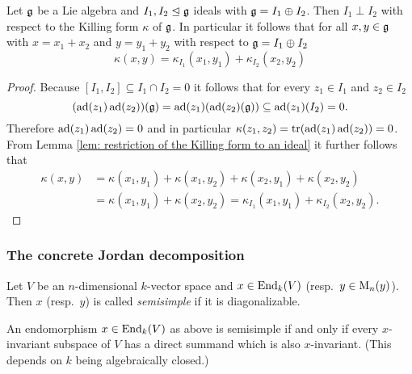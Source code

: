\begin{lem}
 Let $\mathfrak{g}$ be a Lie algebra and $I_1, I_2 \trianglelefteq \mathfrak{g}$ ideals with $\mathfrak{g} = I_1 \oplus I_2$. Then $I_1 \perp I_2$ with respect to the Killing form $\kappa$ of $\mathfrak{g}$. In particular it follows that for all $x,y \in \mathfrak{g}$ with $x = x_1 + x_2$ and $y = y_1 + y_2$ with respect to $\mathfrak{g} = I_1 \oplus I_2$
 \[
  \kappa(x,y) = \kappa_{I_1}(x_1, y_1) + \kappa_{I_2}(x_2, y_2)
 \]
\end{lem}
\begin{proof}
 Because $[I_1, I_2] \subseteq I_1 \cap I_2 = 0$ it follows that for every $z_1 \in I_1$ and $z_2 \in I_2$
 \[
  (\operatorname{ad}(z_1)\operatorname{ad}(z_2))(\mathfrak{g}) = \operatorname{ad}(z_1)(\operatorname{ad}(z_2)(\mathfrak{g})) \subseteq \operatorname{ad}(z_1)(I_2) = 0.
 \]
 Therefore $\operatorname{ad}(z_1)\operatorname{ad}(z_2) = 0$ and in particular $\kappa(z_1,z_2) = \operatorname{tr}(\operatorname{ad}(z_1)\operatorname{ad}(z_2)) = 0$. From Lemma \ref{lem: restriction of the Killing form to an ideal} it further follows that
 \begin{align*}
  \kappa(x,y)
  &= \kappa(x_1, y_1) + \kappa(x_1, y_2) + \kappa(x_2, y_1) + \kappa(x_2, y_2) \\
  &= \kappa(x_1, y_1) + \kappa(x_2, y_2)
  = \kappa_{I_1}(x_1, y_1) + \kappa_{I_2}(x_2, y_2).
 \end{align*}
\end{proof}



\subsubsection{The concrete Jordan decomposition}


\begin{defi}
 Let $V$ be an $n$-dimensional $k$-vector space and $x \in \operatorname{End}_k(V)$ (resp.\ $y \in \operatorname{M}_n(y)$). Then $x$ (resp.\ $y$) is called \emph{semisimple} if it is diagonalizable.
\end{defi}


\begin{rem}
 An endomorphism $x \in \operatorname{End}_k(V)$ as above is semisimple if and only if every $x$-invariant subspace of $V$ has a direct summand which is also $x$-invariant. (This depends on $k$ being algebraically closed.)
\end{rem}


